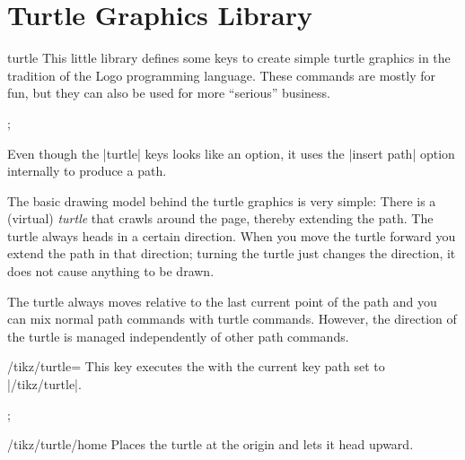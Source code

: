 %
%
%

\section{Turtle Graphics Library}
\label{section-library-tutrle}


\begin{pgflibrary}{turtle}
  This little library defines some keys to create simple turtle
  graphics in the tradition of the Logo programming language. These
  commands are mostly for fun, but they can also be used for more
  ``serious'' business.
\begin{codeexample}[]
\tikz[turtle/distance=2mm]
  \draw [turtle={home,forward,right,forward,left,forward,left,forward}];
\end{codeexample}
\end{pgflibrary}

Even though the |turtle| keys looks like an option, it uses the
|insert path| option internally to produce a path.

The basic drawing model behind the turtle graphics is very simple:
There is a (virtual) \emph{turtle} that crawls around the page,
thereby extending the path. The turtle always heads in a certain
direction. When you move the turtle forward you extend the path in
that direction; turning the turtle just changes the direction, it does
not cause anything to be drawn.

The turtle always moves relative to the last current point of the
path and you can mix normal path commands with turtle
commands. However, the direction of the turtle is managed
independently of other path commands.

\begin{key}{/tikz/turtle=}
  This key executes the  with the current key path set to
  |/tikz/turtle|. 
\begin{codeexample}[]
\tikz[turtle/distance=2mm]
  \draw [turtle={home,fd,rt,fd,lt,fd,lt,fd}];
\end{codeexample}
\end{key}

\begin{key}{/tikz/turtle/home}
  Places the turtle at the origin and lets it head upward. 
\end{key}

